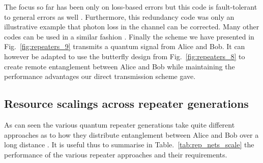 The focus so far has been only on loss-based errors but this code is fault-tolerant to general errors as well \cite{bib:MKLLJ14}. Furthermore, this redundancy code was only an illustrative example that photon loss in the channel can be corrected. Many other codes can be used in a similar fashion \cite{bib:munro12, bib:Fowler10, bib:MKLLJ14}. Finally the scheme we have presented in Fig.~\ref{fig:repeaters_9} transmits a quantum signal from Alice and Bob. It can however be adapted to use the butterfly design from Fig.~\ref{fig:repeaters_8} to create remote entanglement between Alice and Bob while maintaining the performance advantages our direct transmission scheme gave. 

\subsection{Resource scalings across repeater generations}

As can seen the various quantum repeater generations take quite different approaches as to how they distribute entanglement between Alice and Bob over a long distance \cite{bib:Muralidharan2016}. It is useful thus to summarise in Table.~\ref{tab:rep_nets_scale} the performance of the various repeater approaches and their requirements.

